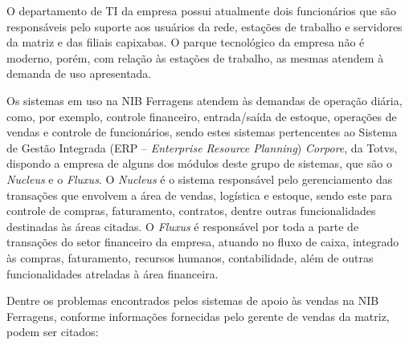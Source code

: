 \documentclass[a4paper]{article}
\begin{document}
{\sffamily
O departamento de TI da empresa possui atualmente dois funcion\'arios que s\~ao respons\'aveis pelo suporte aos
usu\'arios da rede, esta\c{c}\~oes de trabalho e servidores da matriz e das filiais capixabas. O parque tecnol\'ogico
da empresa n\~ao \'e moderno, por\'em, com rela\c{c}\~ao \`as esta\c{c}\~oes de trabalho, as mesmas atendem \`a demanda
de uso apresentada.}

{
\textsf{Os sistemas em uso na NIB Ferragens atendem \`as demandas de opera\c{c}\~ao di\'aria, como, por exemplo,
controle financeiro, entrada/sa\'ida de estoque, opera\c{c}\~oes de vendas e controle de funcion\'arios, sendo estes
sistemas pertencentes ao Sistema de Gest\~ao Integrada (ERP -- }\textsf{\textit{Enterprise Resource Planning}}\textsf{)
}\textsf{\textit{Corpore}}\textsf{, da Totvs, dispondo a empresa de alguns dos m\'odulos deste grupo de sistemas, que
s\~ao o }\textsf{\textit{Nucleus}}\textsf{ e o }\textsf{\textit{Fluxus}}\textsf{. O }\textsf{\textit{Nucleus}}\textsf{
\'e o sistema respons\'avel pelo gerenciamento das transa\c{c}\~oes que envolvem a \'area de vendas, log\'istica e
estoque, sendo este para controle de compras, faturamento, contratos, dentre outras funcionalidades destinadas \`as
\'areas citadas. O }\textsf{\textit{Fluxus}}\textsf{ \'e respons\'avel por toda a parte de transa\c{c}\~oes do setor
financeiro da empresa, atuando no fluxo de caixa, integrado \`as compras, faturamento, recursos humanos, contabilidade,
al\'em de outras funcionalidades atreladas \`a \'area financeira.}}

{
\textsf{Dentre os problemas encontrados pelos sistemas de apoio \`as vendas na NIB Ferragens, conforme informa\c{c}\~oes
fornecidas pelo gerente de vendas da matriz, podem ser citados:}}
\end{document}
